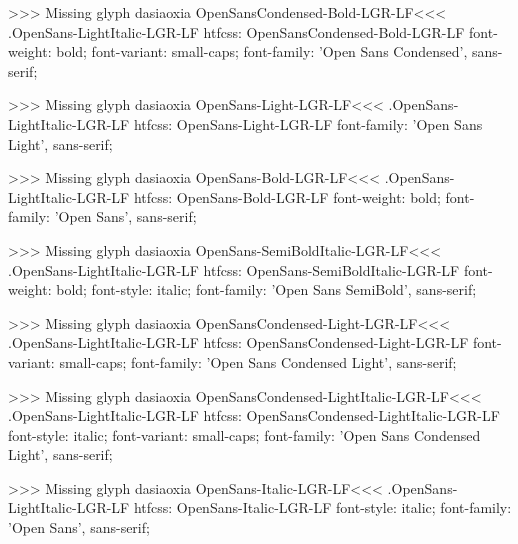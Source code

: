 >>>
Missing glyph	dasiaoxia
\<OpenSansCondensed-Bold-LGR-LF\><<<
.OpenSans-LightItalic-LGR-LF
htfcss:  OpenSansCondensed-Bold-LGR-LF  font-weight: bold; font-variant: small-caps; font-family: 'Open Sans Condensed', sans-serif;

>>>
Missing glyph	dasiaoxia
\<OpenSans-Light-LGR-LF\><<<
.OpenSans-LightItalic-LGR-LF
htfcss:  OpenSans-Light-LGR-LF  font-family: 'Open Sans Light', sans-serif;

>>>
Missing glyph	dasiaoxia
\<OpenSans-Bold-LGR-LF\><<<
.OpenSans-LightItalic-LGR-LF
htfcss:  OpenSans-Bold-LGR-LF  font-weight: bold; font-family: 'Open Sans', sans-serif;

>>>
Missing glyph	dasiaoxia
\<OpenSans-SemiBoldItalic-LGR-LF\><<<
.OpenSans-LightItalic-LGR-LF
htfcss:  OpenSans-SemiBoldItalic-LGR-LF  font-weight: bold; font-style: italic; font-family: 'Open Sans SemiBold', sans-serif;

>>>
Missing glyph	dasiaoxia
\<OpenSansCondensed-Light-LGR-LF\><<<
.OpenSans-LightItalic-LGR-LF
htfcss:  OpenSansCondensed-Light-LGR-LF  font-variant: small-caps; font-family: 'Open Sans Condensed Light', sans-serif;

>>>
Missing glyph	dasiaoxia
\<OpenSansCondensed-LightItalic-LGR-LF\><<<
.OpenSans-LightItalic-LGR-LF
htfcss:  OpenSansCondensed-LightItalic-LGR-LF  font-style: italic; font-variant: small-caps; font-family: 'Open Sans Condensed Light', sans-serif;

>>>
Missing glyph	dasiaoxia
\<OpenSans-Italic-LGR-LF\><<<
.OpenSans-LightItalic-LGR-LF
htfcss:  OpenSans-Italic-LGR-LF  font-style: italic; font-family: 'Open Sans', sans-serif;

